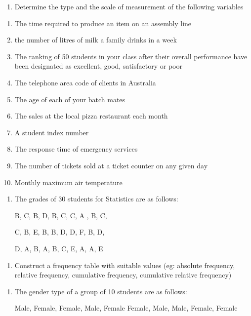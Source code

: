 \documentclass[]{book}
\providecommand{\tightlist}{%
  \setlength{\itemsep}{0pt}\setlength{\parskip}{0pt}}
\begin{document}
\begin{enumerate}
\def\labelenumi{\arabic{enumi}.}
\setcounter{enumi}{1}
\tightlist
\item
  Determine the type and the scale of measurement of the following variables
\end{enumerate}

\begin{enumerate}
\def\labelenumi{\alph{enumi}.}
\tightlist
\item
  The time required to produce an item on an assembly line
\item
  the number of litres of milk a family drinks in a week
\item
  The ranking of 50 students in your class after their overall performance have been designated as excellent, good, satisfactory or poor
\item
  The telephone area code of clients in Australia
\item
  The age of each of your batch mates
\item
  The sales at the local pizza restaurant each month
\item
  A student index number
\item
  The response time of emergency services
\item
  The number of tickets sold at a ticket counter on any given day
\item
  Monthly maximum air temperature
\end{enumerate}

\begin{enumerate}
\def\labelenumi{\arabic{enumi}.}
\setcounter{enumi}{2}
\item
  The grades of 30 students for Statistics are as follows:

  B, C, B, D, B, C, C, A , B, C,

  C, B, E, B, B, D, D, F, B, D,

  D, A, B, A, B, C, E, A, A, E
\end{enumerate}

\begin{enumerate}
\def\labelenumi{\alph{enumi}.}
\tightlist
\item
  Construct a frequency table with suitable values (eg: absolute frequency, relative frequency, cumulative frequency, cumulative relative frequency)
\end{enumerate}

\begin{enumerate}
\def\labelenumi{\arabic{enumi}.}
\setcounter{enumi}{3}
\item
  The gender type of a group of 10 students are as follows:

  Male, Female, Female, Male, Female
  Female, Male, Male, Female, Female
\end{enumerate}
\end{document}
